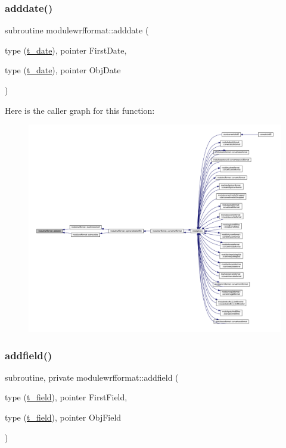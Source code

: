 \subsubsection{\texorpdfstring{adddate()}{adddate()}}
{\footnotesize\ttfamily subroutine modulewrfformat\+::adddate (\begin{DoxyParamCaption}\item[{type (\mbox{\hyperlink{structmodulewrfformat_1_1t__date}{t\+\_\+date}}), pointer}]{First\+Date,  }\item[{type (\mbox{\hyperlink{structmodulewrfformat_1_1t__date}{t\+\_\+date}}), pointer}]{Obj\+Date }\end{DoxyParamCaption})\hspace{0.3cm}{\ttfamily [private]}}

Here is the caller graph for this function\+:\nopagebreak
\begin{figure}[H]
\begin{center}
\leavevmode
\includegraphics[width=350pt]{namespacemodulewrfformat_a12d896f60aea7c34ec138f259778fcd0_icgraph}
\end{center}
\end{figure}
\mbox{\label{namespacemodulewrfformat_a4fec880c8102aff05f702538868fa928}} 
\subsubsection{\texorpdfstring{addfield()}{addfield()}}
{\footnotesize\ttfamily subroutine, private modulewrfformat\+::addfield (\begin{DoxyParamCaption}\item[{type (\mbox{\hyperlink{structmodulewrfformat_1_1t__field}{t\+\_\+field}}), pointer}]{First\+Field,  }\item[{type (\mbox{\hyperlink{structmodulewrfformat_1_1t__field}{t\+\_\+field}}), pointer}]{Obj\+Field }\end{DoxyParamCaption})\hspace{0.3cm}{\ttfamily [private]}}

